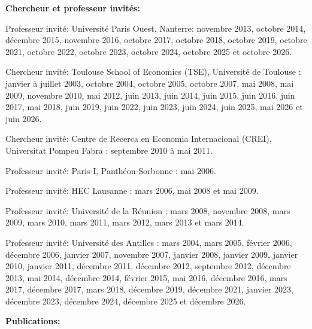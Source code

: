 \centerline{\bf Chercheur et professeur invit\'es:}

\vspace{.3 cm}

\begin{description}
\item Professeur invit\'e: Universit\'e Paris Ouest, Nanterre: novembre 2013, octobre 2014, d\'ecembre 2015, novembre 2016, octobre 2017, octobre 2018, octobre 2019, octobre 2021, octobre 2022, octobre 2023, octobre 2024, octobre 2025 et octobre 2026.
\item Chercheur invit\'e: Toulouse School of Economics (TSE), Universit\'e de Toulouse : janvier \`a
juillet 2003, octobre 2004, octobre 2005, octobre 2007, mai 2008, mai 2009, novembre 2010, mai 2012, juin 2013, juin 2014, juin 2015, juin 2016, juin 2017, mai 2018, juin 2019, juin 2022, juin 2023, juin 2024, juin 2025, mai 2026 et juin 2026.
\item Chercheur invit\'e: Centre de Recerca en Economia Internacional (CREI), Universitat Pompeu Fabra : septembre 2010 \`a mai 2011.
\item Professeur invit\'e: Paris-I, Panth\'eon-Sorbonne : mai 2006.
\item Professeur invit\'e: HEC Lausanne : mars 2006, mai 2008 et mai 2009.
\item Professeur invit\'e: Universit\'e de la R\'eunion : mars 2008, novembre 2008, mars 2009, mars 2010, mars 2011, mars 2012, mars 2013 et mars 2014.
\item Professeur invit\'e: Universit\'e des Antilles : mars 2004, mars 2005, f\'evrier 2006, d\'ecembre 2006,
janvier 2007, novembre 2007, janvier 2008, janvier 2009, janvier 2010, janvier 2011, d\'ecembre 2011, d\'ecembre 2012, septembre 2012, d\'ecembre 2013, mai 2014, d\'ecembre 2014, f\'evrier 2015, mai 2016, d\'ecembre 2016, mars 2017, d\'ecembre 2017, mars 2018, d\'ecembre 2019, d\'ecembre 2021, janvier 2023, d\'ecembre 2023, d\'ecembre 2024, d\'ecembre 2025 et d\'ecembre 2026.
\end{description}


\vspace{.3 cm}

\newpage

\centerline{\bf Publications:}
\vspace{.3 cm}


